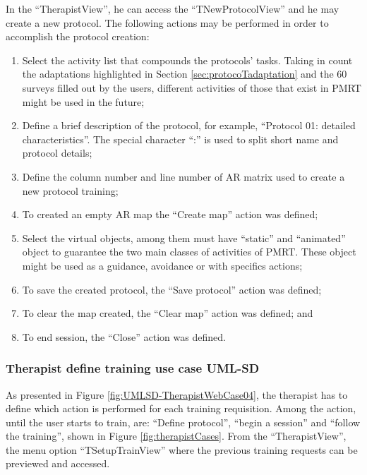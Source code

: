 In the ``TherapistView'', he can access the ``TNewProtocolView'' and he may create a new protocol. The following actions may be performed in order to accomplish the protocol creation:

\begin{enumerate}[label=(\alph*)]
\item Select the activity list that compounds the protocols' tasks. Taking in count the adaptations highlighted in Section \ref{sec:protocoTadaptation} and the 60 surveys filled out by the users, different activities of those that exist in PMRT might be used in the future;
\item Define a brief description of the protocol, for example, ``Protocol 01: detailed characteristics''. The special character ``:'' is used to split short name and protocol details;
\item Define the column number and line number of AR matrix used to create a new protocol training;
\item To created an empty AR map the ``Create map'' action was defined;
\item Select the virtual objects, among them must have ``static'' and ``animated'' object to guarantee the two main classes of activities of PMRT. These object might be used as a guidance, avoidance or with specifics actions;
\item To save the created protocol, the ``Save protocol'' action was defined;
\item To clear the map created, the ``Clear map'' action was defined; and
\item To end session, the ``Close'' action was defined.
\end{enumerate}

\subsubsection{Therapist define training use case UML-SD}

As presented in Figure \ref{fig:UMLSD-TherapistWebCase04}, the therapist has to define which action is performed for each training requisition. Among the action, until the user starts to train, are: ``Define protocol'', ``begin a session'' and ``follow the training'', shown in Figure \ref{fig:therapistCases}. From the ``TherapistView'', the menu option ``TSetupTrainView'' where the previous training requests can be previewed and accessed. 

